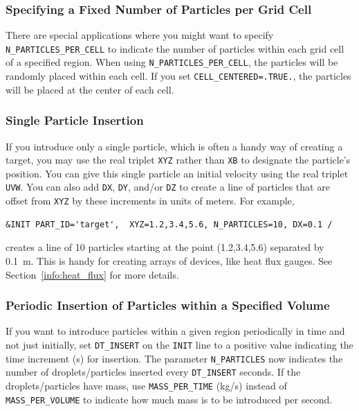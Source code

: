 \documentclass[11pt]{book}
\newcommand{\ct}{\tt\small}
\begin{document}
\subsubsection{Specifying a Fixed Number of Particles per Grid Cell}

There are special applications where you might want to specify {\ct N\_PARTICLES\_PER\_CELL} to indicate the number of particles within each grid cell of a specified region.
When using {\ct N\_PARTICLES\_PER\_CELL}, the particles will be randomly placed within each cell.  If you set {\ct CELL\_CENTERED=.TRUE.}, the particles will be placed at the center of each cell.


\subsubsection{Single Particle Insertion}

If you introduce
only a single particle, which is often a handy way of creating a target, you may use the real triplet {\ct XYZ} rather than {\ct XB} to designate the particle's position.  You can give this single particle an initial velocity using the real triplet {\ct UVW}. You can also add {\ct DX}, {\ct DY}, and/or {\ct DZ} to create a line of particles that are offset from {\ct XYZ} by these increments in units of meters. For example,

\footnotesize
\begin{verbatim}
&INIT PART_ID='target',  XYZ=1.2,3.4,5.6, N_PARTICLES=10, DX=0.1 /
\end{verbatim} \normalsize

\noindent
creates a line of 10 particles starting at the point (1.2,3.4,5.6) separated by 0.1~m. This is handy for creating arrays of devices, like heat flux gauges. See Section~\ref{info:heat_flux} for more details.


\subsubsection{Periodic Insertion of Particles within a Specified Volume}

If you want to introduce particles within a given region periodically in time and not just initially, set {\ct DT\_INSERT} on
the {\ct INIT} line to a positive value indicating the time increment (s) for insertion. The parameter {\ct N\_PARTICLES} now indicates the
number of droplets/particles inserted every {\ct DT\_INSERT} seconds. If the droplets/particles have mass, use {\ct MASS\_PER\_TIME} (kg/s) instead of {\ct MASS\_PER\_VOLUME} to
indicate how much mass is to be introduced per second.
\end{document}
